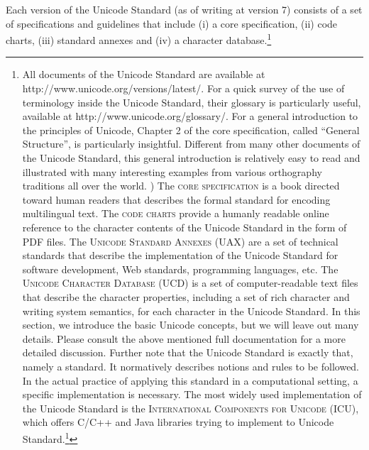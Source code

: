 {{{{{{{{{{Each version of the Unicode Standard (as of writing at version 7) consists of a set of specifications and guidelines that include (i) a core specification, (ii) code charts, (iii) standard annexes and (iv) a character database.\footnote{All documents of the Unicode Standard are available at http://www.unicode.org/versions/latest/. For a quick survey of the use of terminology inside the Unicode Standard, their glossary is particularly useful, available at http://www.unicode.org/glossary/. For a general introduction to the principles of Unicode, Chapter 2 of the core specification, called ``General Structure'', is particularly insightful. Different from many other documents of the Unicode Standard, this general introduction is relatively easy to read and illustrated with many interesting examples from various orthography traditions all over the world. ) The \textsc{core specification} is a book directed toward human readers that describes the formal standard for encoding multilingual text. The \textsc{code charts} provide a humanly readable online reference to the character contents of the Unicode Standard in the form of PDF files. The \textsc{Unicode Standard Annexes (UAX)} are a set of technical standards that describe the implementation of the Unicode Standard for software development, Web standards, programming languages, etc. The \textsc{Unicode Character Database (UCD)} is a set of computer-readable text files that describe the character properties, including a set of rich character and writing system semantics, for each character in the Unicode Standard. In this section, we introduce the basic Unicode concepts, but we will leave out many details. Please consult the above mentioned full documentation for a more detailed discussion. Further note that the Unicode Standard is exactly that, namely a standard. It normatively describes notions and rules to be followed. In the actual practice of applying this standard in a computational setting, a specific implementation is necessary. The most widely used implementation of the Unicode Standard is the \textsc{International Components for Unicode (ICU)}, which offers C/C++ and Java libraries trying to implement to Unicode Standard.\footnote{http://icu-project.org )

}}}}}}}}}}}}
